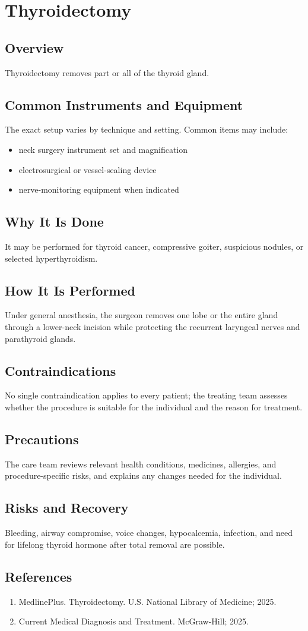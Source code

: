 \chapter{Thyroidectomy}
\section*{Overview}
Thyroidectomy removes part or all of the thyroid gland.
\section*{Common Instruments and Equipment}
The exact setup varies by technique and setting. Common items may include:
\begin{itemize}[nosep,leftmargin=*]
  \item neck surgery instrument set and magnification
  \item electrosurgical or vessel-sealing device
  \item nerve-monitoring equipment when indicated
\end{itemize}

\section*{Why It Is Done}
It may be performed for thyroid cancer, compressive goiter, suspicious nodules, or selected hyperthyroidism.
\section*{How It Is Performed}
Under general anesthesia, the surgeon removes one lobe or the entire gland through a lower-neck incision while protecting the recurrent laryngeal nerves and parathyroid glands.
\section*{Contraindications}
No single contraindication applies to every patient; the treating team assesses whether the procedure is suitable for the individual and the reason for treatment.

\section*{Precautions}
The care team reviews relevant health conditions, medicines, allergies, and procedure-specific risks, and explains any changes needed for the individual.

\section*{Risks and Recovery}
Bleeding, airway compromise, voice changes, hypocalcemia, infection, and need for lifelong thyroid hormone after total removal are possible.
\section*{References}
\begin{enumerate}\item MedlinePlus. Thyroidectomy. U.S. National Library of Medicine; 2025.\item Current Medical Diagnosis and Treatment. McGraw-Hill; 2025.\end{enumerate}
\clearpage
